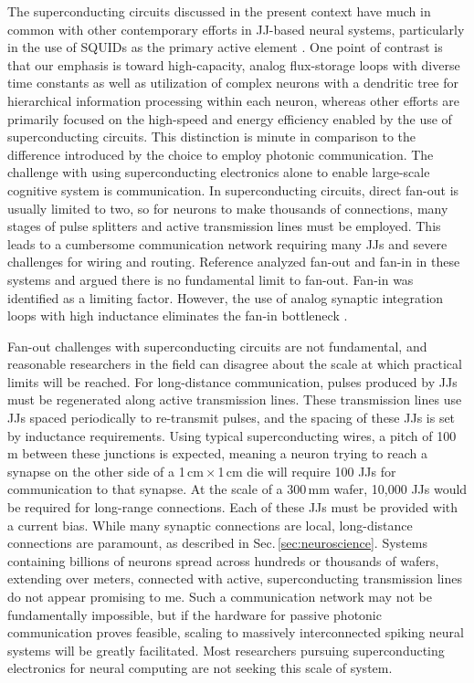 \documentclass[twocolumn]{article}
\newcommand{\onlinecite}[1]{\hspace{-1 ex} \nocite{#1}\citenum{#1}}
\begin{document}
The superconducting circuits discussed in the present context have much in common with other contemporary efforts in JJ-based neural systems, particularly in the use of SQUIDs as the primary active element \cite{crsc2010,scdo2018b}. One point of contrast is that our emphasis is toward high-capacity, analog flux-storage loops with diverse time constants as well as utilization of complex neurons with a dendritic tree for hierarchical information processing within each neuron, whereas other efforts are primarily focused on the high-speed \cite{sele2017} and energy efficiency \cite{klsc2018} enabled by the use of superconducting circuits. This distinction is minute in comparison to the difference introduced by the choice to employ photonic communication. The challenge with using superconducting electronics alone to enable large-scale cognitive system is communication. In superconducting circuits, direct fan-out is usually limited to two, so for neurons to make thousands of connections, many stages of pulse splitters and active transmission lines must be employed. This leads to a cumbersome communication network requiring many JJs and severe challenges for wiring and routing. Reference \onlinecite{scse2020} analyzed fan-out and fan-in in these systems and argued there is no fundamental limit to fan-out. Fan-in was identified as a limiting factor. However, the use of analog synaptic integration loops with high inductance eliminates the fan-in bottleneck \cite{sh2019}.

Fan-out challenges with superconducting circuits are not fundamental, and reasonable researchers in the field can disagree about the scale at which practical limits will be reached. For long-distance communication, pulses produced by JJs must be regenerated along active transmission lines. These transmission lines use JJs spaced periodically to re-transmit pulses, and the spacing of these JJs is set by inductance requirements. Using typical superconducting wires, a pitch of 100\,\textmu m between these junctions is expected, meaning a neuron trying to reach a synapse on the other side of a 1\,cm\,$\times$\,1\,cm die will require 100 JJs for communication to that synapse. At the scale of a 300\,mm wafer, 10,000 JJs would be required for long-range connections. Each of these JJs must be provided with a current bias. While many synaptic connections are local, long-distance connections are paramount, as described in Sec.\,\ref{sec:neuroscience}. Systems containing billions of neurons spread across hundreds or thousands of wafers, extending over meters, connected with active, superconducting transmission lines do not appear promising to me. Such a communication network may not be fundamentally impossible, but if the hardware for passive photonic communication proves feasible, scaling to massively interconnected spiking neural systems will be greatly facilitated. Most researchers pursuing superconducting electronics for neural computing are not seeking this scale of system.
\end{document}
